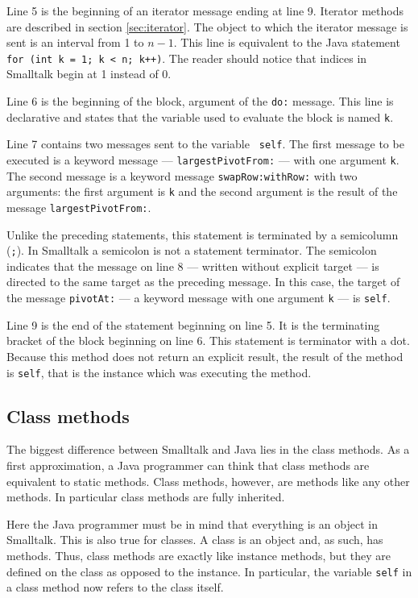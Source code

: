 \documentclass[twoside]{book}
\begin{document}
\noindent Line 5 is the beginning of an iterator message ending at
line 9. Iterator methods are described in section
\ref{sec:iterator}. The object to which the iterator message is
sent is an interval from 1 to $n-1$. This line is equivalent to
the Java statement {\tt for (int k = 1; k < n; k++)}. The reader
should notice that indices in Smalltalk begin at 1 instead of 0.

\noindent Line 6 is the beginning of the block, argument
of the {\tt do:} message. This line is declarative and states that
the variable used to evaluate the block is named {\tt k}.

\noindent Line 7 contains two messages sent to the variable {\tt
self}. The first message to be executed is a keyword message
--- {\tt largestPivotFrom:} --- with one argument {\tt k}. The
second message is a keyword message {\tt swapRow:withRow:} with
two arguments: the first argument is {\tt k} and the second
argument is the result of the message {\tt largestPivotFrom:}.

\noindent Unlike the preceding statements, this statement is
terminated by a semicolumn ({\tt ;}). In Smalltalk a semicolon is
not a statement terminator. The semicolon indicates that the
message on line 8 --- written without explicit target --- is
directed to the same target as the preceding message. In this
case, the target of the message {\tt pivotAt:} --- a keyword
message with one argument {\tt k} --- is {\tt self}.

\noindent Line 9 is the end of the statement beginning on line 5.
It is the terminating bracket of the block beginning on
line 6. This statement is terminator with a dot. Because this
method does not return an explicit result, the result of the
method is {\tt self}, that is the instance which was executing the
method.

\subsection{Class methods}
The biggest difference between Smalltalk and Java lies in the
class methods. As a first approximation, a Java programmer can
think that class methods are equivalent to static methods. Class
methods, however, are methods like any other methods. In
particular class methods are fully inherited.

Here the Java programmer must be in mind that everything is an
object in Smalltalk. This is also true for classes. A class is an
object and, as such, has methods. Thus, class methods are exactly
like instance methods, but they are defined on the class as
opposed to the instance. In particular, the variable {\tt self} in
a class method now refers to the class itself.
\end{document}
